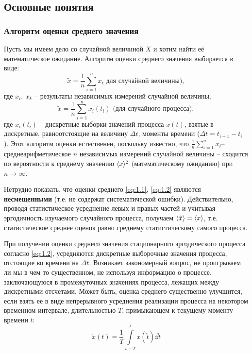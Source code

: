 \subsection{Основные понятия}
\subsubsection{Алгоритм оценки среднего значения}%
\label{sec:algoritm_otsenki_srednego_znacheniia}
Пусть мы имеем дело со случайной величиной $X$ и хотим найти её математическое ожидание.
Алгоритм оценки среднего значения выбирается в виде:
\begin{equation}
\label{eq:1.1}
\tilde x = \frac{1}{n} \sum\limits_{i=1}^{n} x_i \text{ для случайной величины)},
\end{equation}
где $x_i,~x_k$ -- результаты независимых измерений случайной величины;
\begin{equation}
\label{eq:1.2}
\tilde x = \frac{1}{n} \sum\limits_{i=1}^{n} x_i(t_i) \text{ (для случайного процесса)},
\end{equation}
где $x_i(t_i)$ -- дискретные выборки значений процесса $x(t)$, взятые в дискретные,
равноотстоящие на величину $\Delta t$, моменты времени ($\Delta t = t_{i+1}-t_i$ ).
Этот алгоритм оценки естественен, поскольку известно, что $\frac{1}{n} \sum\limits_{i=1}^{n} x_i$-- среднеарифметическое $n$ независимых измерений случайной
величины -- сходится по вероятности к среднему значению $\langle x\rangle^2$ (математическому
ожиданию) при $n \to \infty $.

Нетрудно показать, что оценки среднего \eqref{eq:1.1}, \eqref{eq:1.2}  являются
\textbf{несмещенными} (т.е. не содержат систематической ошибки). Действительно, проводя
статистическое усреднение левых и правых частей и учитывая эргодичность изучаемого
случайного процесса, получаем $\langle\tilde x\rangle = \langle x\rangle$, т.е. статистическое среднее оценок равно среднему
статистическому самого процесса.

При получении оценки среднего значения стационарного эргодического процесса согласно 
\eqref{eq:1.2}, усредняются дискретные выборочные значения процесса, отстоящие во времени 
на $\Delta t$. Возникает закономерный вопрос, не проигрываем ли мы в чем то существенном,
не используя информацию о процессе, заключающуюся в промежуточных значениях процесса,
лежащих между дискретными отсчетами. Может быть, оценка среднего существенно улучшится,
если взять ее в виде непрерывного усреднения реализации процесса на некотором временном 
интервале, длительностью $T$, примыкающем к текущему моменту времени $t$:
\begin{equation}
\label{eq:1.3}
\tilde x(t) = \frac{1}{T} \int\limits_{t-T}^{t} x(\tilde t) \dd{\tilde t} 
\end{equation}

